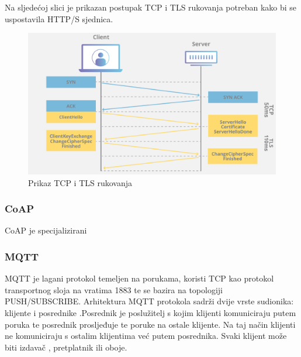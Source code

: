 \documentclass[times, utf8, diplomski]{fer}
\begin{document}
Na sljedećoj slici je prikazan postupak TCP i TLS rukovanja potreban kako bi se uspostavila HTTP/S sjednica.
\begin{figure}[htb]
    \centering
    \includegraphics[width=14cm]{images/tls.png}
    \caption{Prikaz TCP i TLS rukovanja\citep{TLS}}
    \label{fig:tls}
\end{figure}

\subsubsection{CoAP}
CoAP  je specijalizirani 

\subsubsection{MQTT}
MQTT  je lagani protokol temeljen na porukama, koristi TCP kao protokol transportnog sloja na vratima 1883 te se bazira na topologiji PUSH/SUBSCRIBE. Arhitektura MQTT protokola sadrži dvije vrste sudionika: klijente i posrednike .Posrednik je poslužitelj s kojim klijenti komuniciraju putem poruka te posrednik prosljeđuje te poruke na ostale klijente. Na taj način klijenti ne komuniciraju s ostalim klijentima već putem posrednika. Svaki klijent može biti izdavač , pretplatnik  ili oboje. 
\end{document}
